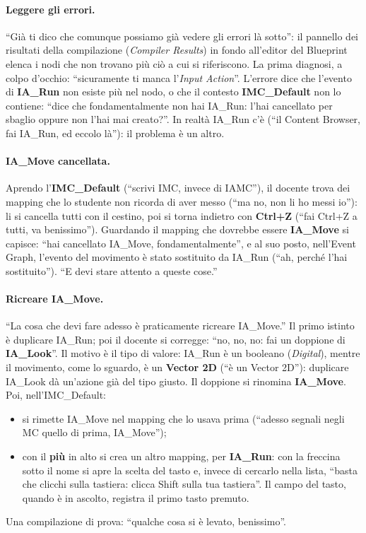 \paragraph{Leggere gli errori.} ``Già ti dico che comunque possiamo già vedere gli
errori là sotto'': il pannello dei risultati della compilazione (\emph{Compiler
Results}) in fondo all'editor del Blueprint elenca i nodi che non trovano più ciò a cui
si riferiscono. La prima diagnosi, a colpo d'occhio: ``sicuramente ti manca
l'\emph{Input Action}''. L'errore dice che l'evento di \textbf{IA\_Run} non esiste più
nel nodo, o che il contesto \textbf{IMC\_Default} non lo contiene: ``dice che
fondamentalmente non hai IA\_Run: l'hai cancellato per sbaglio oppure non l'hai mai
creato?''. In realtà IA\_Run c'è (``il Content Browser, fai IA\_Run, ed eccolo là''): il
problema è un altro.

\paragraph{IA\_Move cancellata.} Aprendo l'\textbf{IMC\_Default} (``scrivi IMC, invece di
IAMC''), il docente trova dei mapping che lo studente non ricorda di aver messo (``ma no,
non li ho messi io''): li si cancella tutti con il cestino, poi si torna indietro con
\textbf{Ctrl+Z} (``fai Ctrl+Z a tutti, va benissimo''). Guardando il mapping che dovrebbe
essere \textbf{IA\_Move} si capisce: ``hai cancellato IA\_Move, fondamentalmente'', e al
suo posto, nell'Event Graph, l'evento del movimento è stato sostituito da IA\_Run (``ah,
perché l'hai sostituito''). ``E devi stare attento a queste cose.''

\paragraph{Ricreare IA\_Move.} ``La cosa che devi fare adesso è praticamente ricreare
IA\_Move.'' Il primo istinto è duplicare IA\_Run; poi il docente si corregge: ``no, no,
no: fai un doppione di \textbf{IA\_Look}''. Il motivo è il tipo di valore: IA\_Run è un
booleano (\emph{Digital}), mentre il movimento, come lo sguardo, è un \textbf{Vector 2D}
(``è un Vector 2D''): duplicare IA\_Look dà un'azione già del tipo giusto. Il doppione si
rinomina \textbf{IA\_Move}. Poi, nell'IMC\_Default:
\begin{itemize}
  \item si rimette IA\_Move nel mapping che lo usava prima (``adesso segnali negli MC
        quello di prima, IA\_Move'');
  \item con il \textbf{più} in alto si crea un altro mapping, per \textbf{IA\_Run}: con la
        freccina sotto il nome si apre la scelta del tasto e, invece di cercarlo nella
        lista, ``basta che clicchi sulla tastiera: clicca Shift sulla tua tastiera''. Il
        campo del tasto, quando è in ascolto, registra il primo tasto premuto.
\end{itemize}
Una compilazione di prova: ``qualche cosa si è levato, benissimo''.

